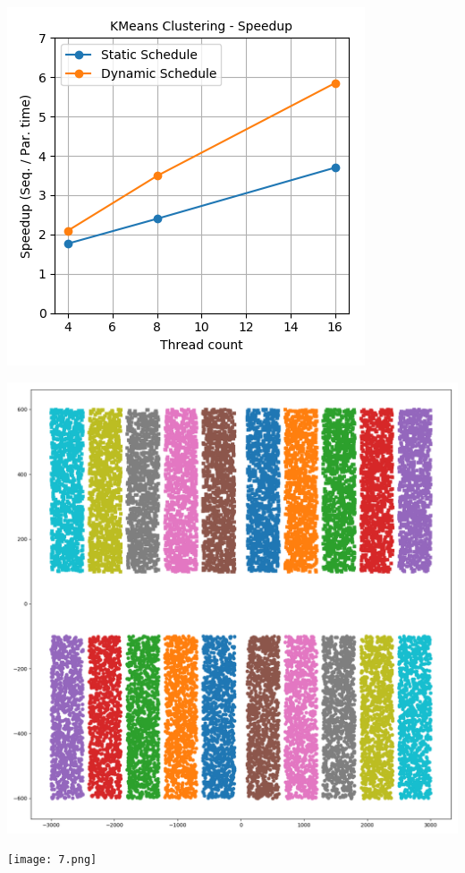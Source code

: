 \documentclass[11pt,a4paper,oneside]{article}
\begin{document}
	\begin{center}
		\includegraphics[scale=0.6]{1.png}		
	\end{center}

    \begin{center}
    	\includegraphics[scale=0.6]{2.png}		
    \end{center}

    \begin{center}
    	\texttt{[image: 7.png]}		
    \end{center}
\end{document}
